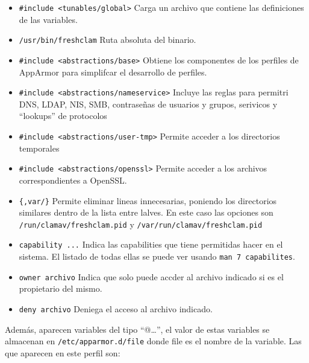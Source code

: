 \documentclass{article}
\begin{document}
\begin{itemize}
    \item \verb|#include <tunables/global>| Carga un archivo que contiene las definiciones de las variables.
    \item \verb|/usr/bin/freshclam| Ruta absoluta del binario.
    \item \verb|#include <abstractions/base>| Obtiene los componentes de los perfiles de AppArmor para simplifcar el desarrollo de perfiles.
    \item \verb|#include <abstractions/nameservice>| Incluye las reglas para permitri DNS, LDAP, NIS, SMB, contraseñas de usuarios y grupos, serivicos y ``lookups'' de protocolos
    \item \verb|#include <abstractions/user-tmp>| Permite acceder a los directorios temporales
    \item \verb|#include <abstractions/openssl>| Permite acceder a los archivos correspondientes a OpenSSL.
    \item \verb|{,var/}| Permite eliminar lineas innecesarias, poniendo los directorios similares dentro de la lista entre lalves. En este caso las opciones son \verb|/run/clamav/freshclam.pid| y \verb|/var/run/clamav/freshclam.pid|
    \item \verb|capability ...| Indica las capabilities que tiene permitidas hacer en el sistema. El listado de todas ellas se puede ver usando \verb|man 7 capabilites|.
    \item \verb|owner archivo| Indica que solo puede accder al archivo indicado si es el propietario del mismo.
    \item \verb|deny archivo| Deniega el acceso al archivo indicado.
\end{itemize}

Además, aparecen variables del tipo ``@{\dots}'', el valor de estas variables se almacenan en \verb|/etc/apparmor.d/file| donde file es el nombre de la variable. Las que aparecen en este perfil son:
\end{document}
